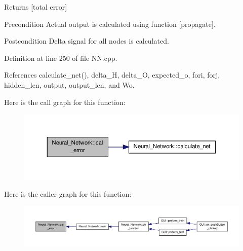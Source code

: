 \begin{DoxyReturn}{Returns}
\mbox{[}total error\mbox{]} 
\end{DoxyReturn}
\begin{DoxyPrecond}{Precondition}
Actual output is calculated using function \mbox{[}propagate\mbox{]}. 
\end{DoxyPrecond}
\begin{DoxyPostcond}{Postcondition}
Delta signal for all nodes is calculated. 
\end{DoxyPostcond}


Definition at line 250 of file N\-N.\-cpp.



References calculate\-\_\-net(), delta\-\_\-\-H, delta\-\_\-\-O, expected\-\_\-o, fori, forj, hidden\-\_\-len, output, output\-\_\-len, and Wo.



Here is the call graph for this function\-:\nopagebreak
\begin{figure}[H]
\begin{center}
\leavevmode
\includegraphics[width=350pt]{d1/d7c/a00003_a3e503ddab5bbc51f6e0b79b67ca6ed2f_cgraph}
\end{center}
\end{figure}




Here is the caller graph for this function\-:\nopagebreak
\begin{figure}[H]
\begin{center}
\leavevmode
\includegraphics[width=350pt]{d1/d7c/a00003_a3e503ddab5bbc51f6e0b79b67ca6ed2f_icgraph}
\end{center}
\end{figure}



